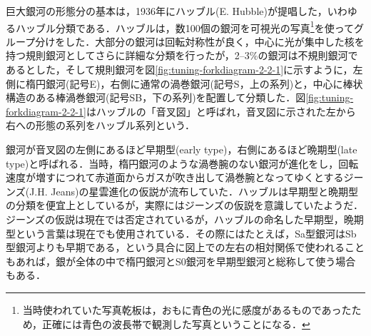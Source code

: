 巨大銀河の形態分の基本は，1936年にハッブル(E. Hubble)が提唱した，いわゆるハッブル分類である．ハッブルは，数100個の銀河を可視光の写真\footnote{当時使われていた写真乾板は，おもに青色の光に感度があるものであったため，正確には青色の波長帯で観測した写真ということになる．}を使ってグループ分けをした．大部分の銀河は回転対称性が良く，中心に光が集中した核を持つ規則銀河としてさらに詳細な分類を行ったが，2--3\%の銀河は不規則銀河であるとした，そして規則銀河を図\ref{fig:tuning-forkdiagram-2-2-1}に示すように，左側に楕円銀河(記号E)，右側に通常の渦巻銀河(記号S，上の系列)と，中心に棒状構造のある棒渦巻銀河(記号SB，下の系列)を配置して分類した．図\ref{fig:tuning-forkdiagram-2-2-1}はハッブルの「音叉図」と呼ばれ，音叉図に示された左から右への形態の系列をハッブル系列という．

銀河が音叉図の左側にあるほど早期型(early type)，右側にあるほど晩期型(late type)と呼ばれる．当時，楕円銀河のような渦巻腕のない銀河が進化をし，回転速度が増すにつれて赤道面からガスが吹き出して渦巻腕となってゆくとするジーンズ(J.H. Jeans)の星雲進化の仮説が流布していた．ハッブルは早期型と晩期型の分類を便宜上としているが，実際にはジーンズの仮説を意識していたようだ．ジーンズの仮説は現在では否定されているが，ハッブルの命名した早期型，晩期型という言葉は現在でも使用されている．その際にはたとえば，Sa型銀河はSb型銀河よりも早期である，という具合に図上での左右の相対関係で使われることもあれば，銀が全体の中で楕円銀河とS0銀河を早期型銀河と総称して使う場合もある．





